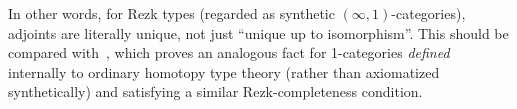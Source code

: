 \documentclass[12pt]{amsart}
\theoremstyle{plain}
\theoremstyle{definition}
\newtheorem{defn}[thm]{Definition}
\theoremstyle{remark}
\numberwithin{equation}{section}
\newcommand{\extfn}[1]{{#1}_\#}
\newcommand{\defeq}{\coloneqq}
\newcommand{\univtype}{\mathcal{U}}
\newcommand{\two}{\mathbb{2}}
\newcommand{\comma}{\!\downarrow\!}
\newcommand{\Parens}[1]{\Bigl(#1\Bigr)}
\begin{document}
In other words, for Rezk types (regarded as synthetic $(\infty,1)$-categories), adjoints are literally unique, not just ``unique up to isomorphism''.
This should be compared with~\cite[Lemma 9.3.2]{hottbook}, which proves an analogous fact for 1-categories \emph{defined} internally to ordinary homotopy type theory (rather than axiomatized synthetically) and satisfying a similar Rezk-completeness condition.






\end{document}
